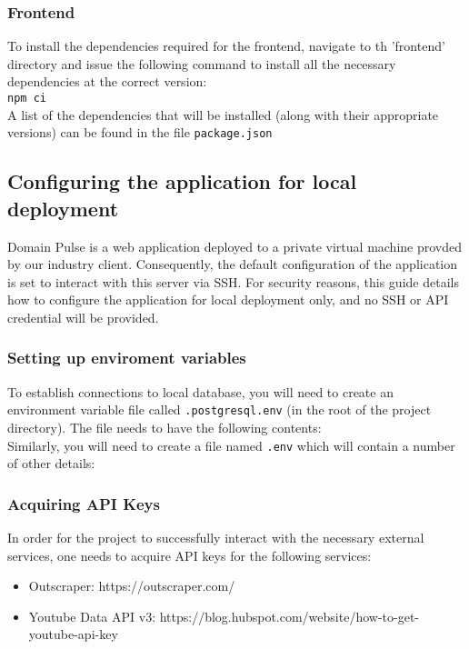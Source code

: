 \documentclass{article}
\newcommand{\code}[1]{\colorbox{light-gray}{\texttt{#1}}}
\begin{document}
\subsubsection{Frontend}
To install the dependencies required for the frontend, navigate to th 'frontend' directory and issue the following command to install
all the necessary dependencies at the correct version: \\
\code{npm ci}\\
A list of the dependencies that will be installed (along with their appropriate versions) can be found in the file \code{package.json}


\subsection{Configuring the application for local deployment}
Domain Pulse is a web application deployed to a private virtual machine provded by our industry client. Consequently, the default
configuration of the application is set to interact with this server via SSH. For security reasons, this guide details how to configure
the application for local deployment only, and no SSH or API credential will be provided.

\subsubsection{Setting up enviroment variables}
To establish connections to local database, you will need to create an environment variable file called \code{.postgresql.env} (in the root of the project directory). The file
needs to have the following contents: \\
Similarly, you will need to create a file named \code{.env} which will contain a number of other details: \\


\subsubsection{Acquiring API Keys}
In order for the project to successfully interact with the necessary external services, one needs to acquire API keys for the following services:
\begin{itemize}
    \item Outscraper: https://outscraper.com/
    \item Youtube Data API v3: https://blog.hubspot.com/website/how-to-get-youtube-api-key
\end{itemize}
\end{document}
